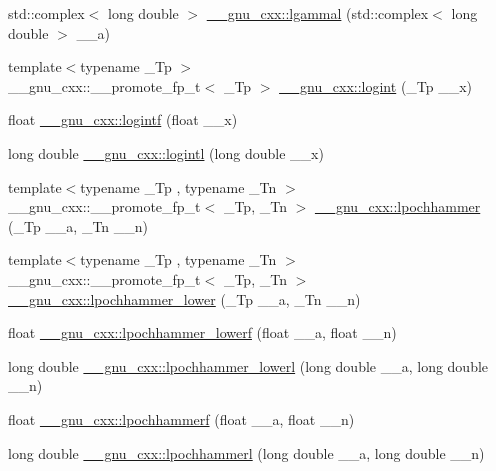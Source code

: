 \begin{DoxyCompactItemize}
\item 
std\+::complex$<$ long double $>$ \hyperlink{group__gnu__math__spec__func_ga5f12f60afe9a47f4ca04964f642bbf0d}{\+\_\+\+\_\+gnu\+\_\+cxx\+::lgammal} (std\+::complex$<$ long double $>$ \+\_\+\+\_\+a)
\item 
{\footnotesize template$<$typename \+\_\+\+Tp $>$ }\\\+\_\+\+\_\+gnu\+\_\+cxx\+::\+\_\+\+\_\+promote\+\_\+fp\+\_\+t$<$ \+\_\+\+Tp $>$ \hyperlink{group__gnu__math__spec__func_gab9635c9acbe4120358c3cba8931dc54d}{\+\_\+\+\_\+gnu\+\_\+cxx\+::logint} (\+\_\+\+Tp \+\_\+\+\_\+x)
\item 
float \hyperlink{group__gnu__math__spec__func_gab878da3ba2f5c1d49d96eadde533b233}{\+\_\+\+\_\+gnu\+\_\+cxx\+::logintf} (float \+\_\+\+\_\+x)
\item 
long double \hyperlink{group__gnu__math__spec__func_gab17f5cadc8f77ba2666d0d5ecc78de5d}{\+\_\+\+\_\+gnu\+\_\+cxx\+::logintl} (long double \+\_\+\+\_\+x)
\item 
{\footnotesize template$<$typename \+\_\+\+Tp , typename \+\_\+\+Tn $>$ }\\\+\_\+\+\_\+gnu\+\_\+cxx\+::\+\_\+\+\_\+promote\+\_\+fp\+\_\+t$<$ \+\_\+\+Tp, \+\_\+\+Tn $>$ \hyperlink{group__gnu__math__spec__func_ga68c4a9e8b38757a21ac54c55fe4e8dda}{\+\_\+\+\_\+gnu\+\_\+cxx\+::lpochhammer} (\+\_\+\+Tp \+\_\+\+\_\+a, \+\_\+\+Tn \+\_\+\+\_\+n)
\item 
{\footnotesize template$<$typename \+\_\+\+Tp , typename \+\_\+\+Tn $>$ }\\\+\_\+\+\_\+gnu\+\_\+cxx\+::\+\_\+\+\_\+promote\+\_\+fp\+\_\+t$<$ \+\_\+\+Tp, \+\_\+\+Tn $>$ \hyperlink{group__gnu__math__spec__func_ga4975d412b8e15f499a4da7b4e3f535c6}{\+\_\+\+\_\+gnu\+\_\+cxx\+::lpochhammer\+\_\+lower} (\+\_\+\+Tp \+\_\+\+\_\+a, \+\_\+\+Tn \+\_\+\+\_\+n)
\item 
float \hyperlink{group__gnu__math__spec__func_ga7a6c48d5e06ffa4972d78db3ce46f8de}{\+\_\+\+\_\+gnu\+\_\+cxx\+::lpochhammer\+\_\+lowerf} (float \+\_\+\+\_\+a, float \+\_\+\+\_\+n)
\item 
long double \hyperlink{group__gnu__math__spec__func_ga39e5ecc81b33d28a54672855b7da3235}{\+\_\+\+\_\+gnu\+\_\+cxx\+::lpochhammer\+\_\+lowerl} (long double \+\_\+\+\_\+a, long double \+\_\+\+\_\+n)
\item 
float \hyperlink{group__gnu__math__spec__func_ga0b14e36032c36b1ebf79ea2af65f4f90}{\+\_\+\+\_\+gnu\+\_\+cxx\+::lpochhammerf} (float \+\_\+\+\_\+a, float \+\_\+\+\_\+n)
\item 
long double \hyperlink{group__gnu__math__spec__func_ga1057026f8679c601ecddd7c8d33edbc9}{\+\_\+\+\_\+gnu\+\_\+cxx\+::lpochhammerl} (long double \+\_\+\+\_\+a, long double \+\_\+\+\_\+n)

\end{DoxyCompactItemize}
